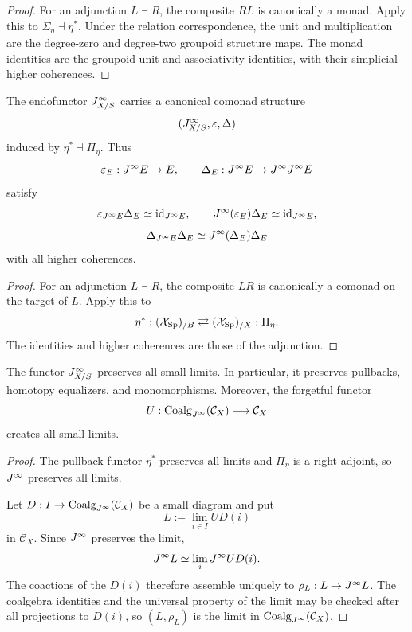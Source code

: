 \begin{proof}
For an adjunction $L\dashv R$, the composite $RL$ is canonically a monad.  Apply this to $\Sigma_\eta\dashv\eta^*$.  Under the relation correspondence, the unit and multiplication are the degree-zero and degree-two groupoid structure maps.  The monad identities are the groupoid unit and associativity identities, with their simplicial higher coherences.
\end{proof}

\begin{theorem}
\label{thm:jet-comonad}
The endofunctor $J^{\infty}_{X/S}$ carries a canonical comonad structure
\[
    (J^{\infty}_{X/S},\varepsilon,\Delta)
\]
induced by $\eta^*\dashv\Pi_\eta$.  Thus
\[
    \varepsilon_E:J^{\infty} E\to E,
    \qquad
    \Delta_E:J^{\infty} E\to J^{\infty}J^{\infty} E
\]
satisfy
\[
    \varepsilon_{J^{\infty} E}\Delta_E\simeq\operatorname{id}_{J^{\infty} E},
    \qquad
    J^{\infty}(\varepsilon_E)\Delta_E\simeq\operatorname{id}_{J^{\infty} E},
\]
\[
    \Delta_{J^{\infty} E}\Delta_E
    \simeq
    J^{\infty}(\Delta_E)\Delta_E
\]
with all higher coherences.
\end{theorem}

\begin{proof}
For an adjunction $L\dashv R$, the composite $LR$ is canonically a comonad on the target of $L$.  Apply this to
\[
    \eta^*:(\mathcal{X}_{\mathrm{Sp}})_{/B}\rightleftarrows(\mathcal{X}_{\mathrm{Sp}})_{/X}:\Pi_\eta.
\]
The identities and higher coherences are those of the adjunction.
\end{proof}

\begin{proposition}
\label{prop:jet-limit-preservation}
The functor $J^{\infty}_{X/S}$ preserves all small limits.  In particular, it preserves pullbacks, homotopy equalizers, and monomorphisms.  Moreover, the forgetful functor
\[
    U:\operatorname{Coalg}_{J^{\infty}}(\mathcal C_X)\longrightarrow\mathcal C_X
\]
creates all small limits.
\end{proposition}

\begin{proof}
The pullback functor $\eta^*$ preserves all limits and $\Pi_\eta$ is a right adjoint, so $J^{\infty}$ preserves all limits.

Let $D:I\to\operatorname{Coalg}_{J^{\infty}}(\mathcal C_X)$ be a small diagram and put
\[
    L:=\lim_{i\in I}UD(i)
\]
in $\mathcal C_X$.  Since $J^{\infty}$ preserves the limit,
\[
    J^{\infty} L\simeq\lim_iJ^{\infty} UD(i).
\]
The coactions of the $D(i)$ therefore assemble uniquely to $\rho_L:L\to J^{\infty} L$.  The coalgebra identities and the universal property of the limit may be checked after all projections to $D(i)$, so $(L,\rho_L)$ is the limit in $\operatorname{Coalg}_{J^{\infty}}(\mathcal C_X)$.
\end{proof}

